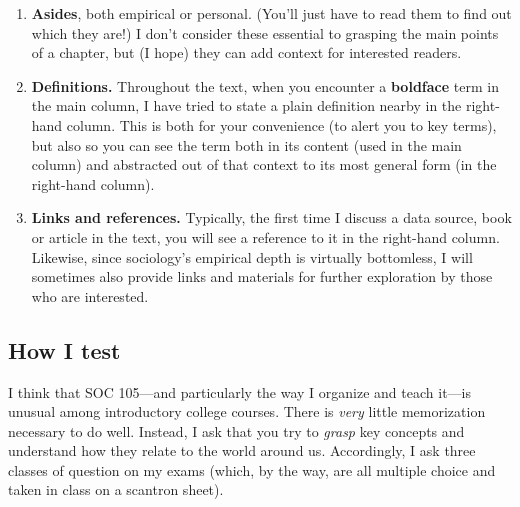 \documentclass[
  letterpaper,
  DIV=11,
  numbers=noendperiod,
  oneside]{scrartcl}
\providecommand{\tightlist}{%
  \setlength{\itemsep}{0pt}\setlength{\parskip}{0pt}}
\begin{document}
\begin{enumerate}
\def\labelenumi{\arabic{enumi}.}
\tightlist
\item
  \textbf{Asides}, both empirical or personal. (You'll just have to read
  them to find out which they are!) I don't consider these essential to
  grasping the main points of a chapter, but (I hope) they can add
  context for interested readers.
\item
  \textbf{Definitions.} Throughout the text, when you encounter a
  \textbf{boldface} term in the main column, I have tried to state a
  plain definition nearby in the
  right-hand column. This is both for your convenience (to alert you to
  key terms), but also so you can see the term both in its content (used
  in the main column) and abstracted out of that context to its most
  general form (in the right-hand column).
\item
  \textbf{Links and references.} Typically, the first time I discuss a
  data source, book or article in the text, you will see a reference to
  it in the right-hand column. Likewise, since sociology's empirical
  depth is virtually bottomless, I will sometimes also provide links and
  materials for further exploration by those who are interested.
\end{enumerate}

\subsection{How I test}\label{how-i-test}

I think that SOC 105---and particularly the way I organize and teach
it---is unusual among introductory college courses. There is \emph{very}
little memorization necessary to do well. Instead, I ask that you try to
\emph{grasp} key concepts and understand how they relate to the world
around us. Accordingly, I ask three classes of question on my exams
(which, by the way, are all multiple choice and taken in class on a
scantron sheet).
\end{document}
